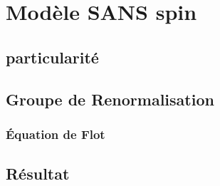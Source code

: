 \chapter{Modèle SANS spin}

\section{particularité}

\section{Groupe de Renormalisation}

\subsection{Équation de Flot}

\section{Résultat}
